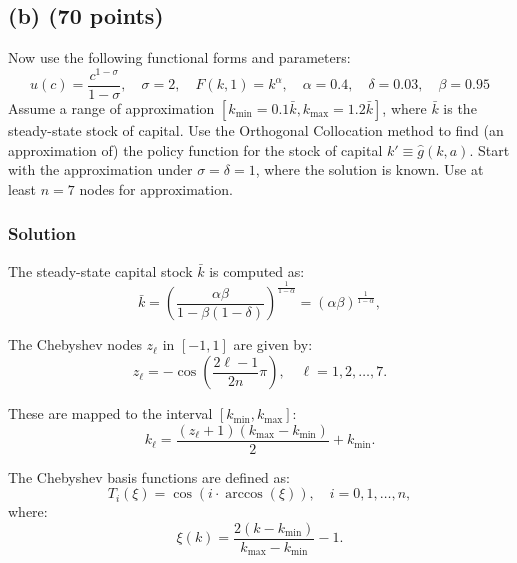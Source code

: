 \documentclass[12pt]{article}
\begin{document}
\bigskip

\subsection*{(b) (70 points)}
Now use the following functional forms and parameters:
\[
u(c) = \frac{c^{1-\sigma}}{1-\sigma}, \quad \sigma = 2, \quad F(k, 1) = k^\alpha, \quad \alpha = 0.4, \quad \delta = 0.03, \quad \beta = 0.95
\]
Assume a range of approximation \( [k_{\min} = 0.1\bar{k}, k_{\max} = 1.2\bar{k}] \), where \( \bar{k} \) is the steady-state stock of capital. Use the Orthogonal Collocation method to find (an approximation of) the policy function for the stock of capital \( k' \equiv \hat{g}(k, a) \). Start with the approximation under \( \sigma = \delta = 1 \), where the solution is known. Use at least \( n = 7 \) nodes for approximation.

\subsubsection*{Solution}

The steady-state capital stock $\bar{k}$ is computed as:
\[
\bar{k} = \left( \frac{\alpha \beta}{1 - \beta (1 - \delta)} \right)^{\frac{1}{1 - \alpha}} = \left( \alpha \beta \right)^{\frac{1}{1 - \alpha}},
\]

The Chebyshev nodes $z_\ell$ in $[-1, 1]$ are given by:
\[
z_\ell = -\cos\left(\frac{2\ell - 1}{2n} \pi\right), \quad \ell = 1, 2, \dots, 7.
\]

These are mapped to the interval $[k_{\min}, k_{\max}]$:
\[
k_\ell = \frac{(z_\ell + 1)(k_{\max} - k_{\min})}{2} + k_{\min}.
\]

The Chebyshev basis functions are defined as:
\[
T_i(\xi) = \cos\left(i \cdot \arccos(\xi)\right), \quad i = 0, 1, \dots, n,
\]
where:
\[
\xi(k) = \frac{2(k - k_{\min})}{k_{\max} - k_{\min}} - 1.
\]
\end{document}
